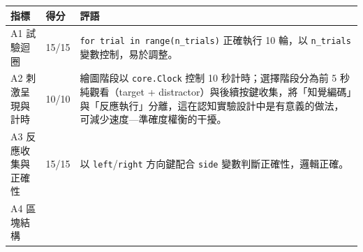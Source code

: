 \documentclass[14pt,]{extarticle}
\begin{document}
\begin{longtable}[]{@{}lll@{}}
\toprule
\begin{minipage}[b]{0.09\columnwidth}\raggedright
指標\strut
\end{minipage} & \begin{minipage}[b]{0.03\columnwidth}\raggedright
得分\strut
\end{minipage} & \begin{minipage}[b]{0.80\columnwidth}\raggedright
評語\strut
\end{minipage}\tabularnewline
\midrule
\endhead
\begin{minipage}[t]{0.09\columnwidth}\raggedright
A1 試驗迴圈\strut
\end{minipage} & \begin{minipage}[t]{0.03\columnwidth}\raggedright
15/15\strut
\end{minipage} & \begin{minipage}[t]{0.80\columnwidth}\raggedright
\texttt{for\ trial\ in\ range(n\_trials)} 正確執行 10 輪，以
\texttt{n\_trials} 變數控制，易於調整。\strut
\end{minipage}\tabularnewline
\begin{minipage}[t]{0.09\columnwidth}\raggedright
A2 刺激呈現與計時\strut
\end{minipage} & \begin{minipage}[t]{0.03\columnwidth}\raggedright
10/10\strut
\end{minipage} & \begin{minipage}[t]{0.80\columnwidth}\raggedright
繪圖階段以 \texttt{core.Clock} 控制 10 秒計時；選擇階段分為前 5
秒純觀看（target +
distractor）與後續按鍵收集，將「知覺編碼」與「反應執行」分離，這在認知實驗設計中是有意義的做法，可減少速度---準確度權衡的干擾。\strut
\end{minipage}\tabularnewline
\begin{minipage}[t]{0.09\columnwidth}\raggedright
A3 反應收集與正確性\strut
\end{minipage} & \begin{minipage}[t]{0.03\columnwidth}\raggedright
15/15\strut
\end{minipage} & \begin{minipage}[t]{0.80\columnwidth}\raggedright
以 \texttt{left}/\texttt{right} 方向鍵配合 \texttt{side}
變數判斷正確性，邏輯正確。\strut
\end{minipage}\tabularnewline
\begin{minipage}[t]{0.09\columnwidth}\raggedright
A4 區塊結構\strut
\end{minipage} & \begin{minipage}[t]{0.03\columnwidth}\raggedright

\end{minipage}
\end{longtable}
\end{document}
